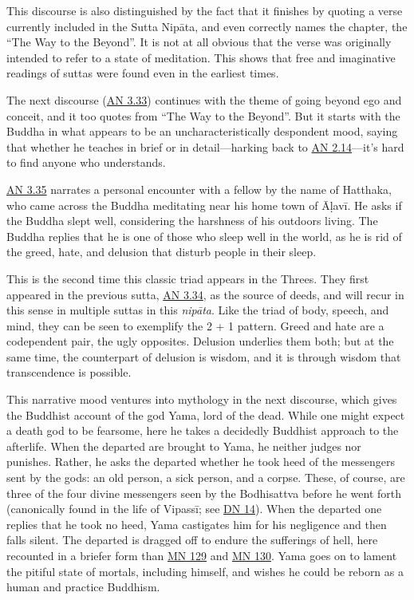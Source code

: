 \documentclass[12pt,openany]{book}%
\begin{document}
This discourse is also distinguished by the fact that it finishes by quoting a verse currently included in the Sutta \textsanskrit{Nipāta}, and even correctly names the chapter, the “The Way to the Beyond”. It is not at all obvious that the verse was originally intended to refer to a state of meditation. This shows that free and imaginative readings of suttas were found even in the earliest times.

The next discourse (\href{https://suttacentral.net/an3.33}{AN 3.33}) continues with the theme of going beyond ego and conceit, and it too quotes from “The Way to the Beyond”. But it starts with the Buddha in what appears to be an uncharacteristically despondent mood, saying that whether he teaches in brief or in detail—harking back to \href{https://suttacentral.net/an2.11{-}20}{AN 2.14}—it’s hard to find anyone who understands.

\href{https://suttacentral.net/an3.35}{AN 3.35} narrates a personal encounter with a fellow by the name of Hatthaka, who came across the Buddha meditating near his home town of \textsanskrit{Āḷavī}. He asks if the Buddha slept well, considering the harshness of his outdoors living. The Buddha replies that he is one of those who sleep well in the world, as he is rid of the greed, hate, and delusion that disturb people in their sleep.

This is the second time this classic triad appears in the Threes. They first appeared in the previous sutta, \href{https://suttacentral.net/an3.34}{AN 3.34}, as the source of deeds, and will recur in this sense in multiple suttas in this \textit{\textsanskrit{nipāta}}. Like the triad of body, speech, and mind, they can be seen to exemplify the 2 + 1 pattern. Greed and hate are a codependent pair, the ugly opposites. Delusion underlies them both; but at the same time, the counterpart of delusion is wisdom, and it is through wisdom that transcendence is possible.

This narrative mood ventures into mythology in the next discourse, which gives the Buddhist account of the god Yama, lord of the dead. While one might expect a death god to be fearsome, here he takes a decidedly Buddhist approach to the afterlife. When the departed are brought to Yama, he neither judges nor punishes. Rather, he asks the departed whether he took heed of the messengers sent by the gods: an old person, a sick person, and a corpse. These, of course, are three of the four divine messengers seen by the Bodhisattva before he went forth (canonically found in the life of \textsanskrit{Vipassī}; see \href{https://suttacentral.net/dn14}{DN 14}). When the departed one replies that he took no heed, Yama castigates him for his negligence and then falls silent. The departed is dragged off to endure the sufferings of hell, here recounted in a briefer form than \href{https://suttacentral.net/mn129}{MN 129} and \href{https://suttacentral.net/mn130}{MN 130}. Yama goes on to lament the pitiful state of mortals, including himself, and wishes he could be reborn as a human and practice Buddhism.
\end{document}
